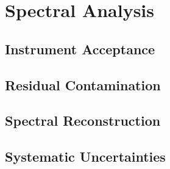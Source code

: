 \section{Spectral Analysis}

\subsection{Instrument Acceptance}

\subsection{Residual Contamination}

\subsection{Spectral Reconstruction}

\subsection{Systematic Uncertainties}